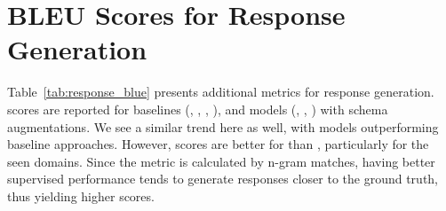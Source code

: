 \section{BLEU Scores for Response Generation}
\label{sec:appendix_bleu}

Table~\ref{tab:response_blue} presents additional metrics for response generation. {\bleu} scores are reported for baselines ({\simpletod}, {\soloist}, {\zstod}, {\autotod}), and {\oursys} models (\gpt, \llamai, \flan) with schema augmentations.
We see a similar trend here as well, with {\oursys} models outperforming baseline approaches. 
However, {\bleu} scores are better for {\llamai} than {\flan}, particularly for the seen domains. 
Since the {\bleu} metric is calculated by n-gram matches, {\llamai} having better supervised performance tends to generate responses closer to the ground truth, thus yielding higher {\bleu} scores.


